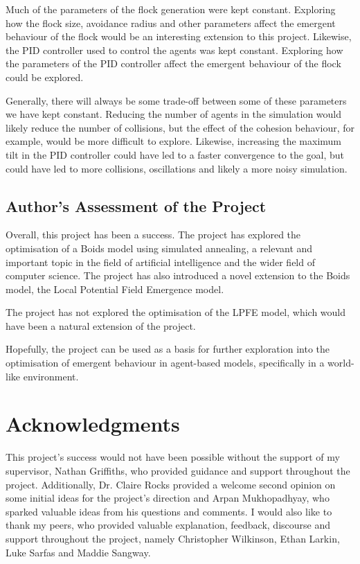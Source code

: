 \documentclass[12pt]{article}
\begin{document}
Much of the parameters of the flock generation were kept constant. Exploring how the flock size, avoidance radius and other parameters affect the emergent behaviour of the flock would be an interesting extension to this project. Likewise, the PID controller used to control the agents was kept constant. Exploring how the parameters of the PID controller affect the emergent behaviour of the flock could be explored.

Generally, there will always be some trade-off between some of these parameters we have kept constant. Reducing the number of agents in the simulation would likely reduce the number of collisions, but the effect of the cohesion behaviour, for example, would be more difficult to explore. Likewise, increasing the maximum tilt in the PID controller could have led to a faster convergence to the goal, but could have led to more collisions, oscillations and likely a more noisy simulation.

\subsection{Author's Assessment of the Project}


Overall, this project has been a success. The project has explored the optimisation of a Boids model using simulated annealing, a relevant and important topic in the field of artificial intelligence and the wider field of computer science. The project has also introduced a novel extension to the Boids model, the Local Potential Field Emergence model.

The project has not explored the optimisation of the LPFE model, which would have been a natural extension of the project.

Hopefully, the project can be used as a basis for further exploration into the optimisation of emergent behaviour in agent-based models, specifically in a world-like environment.

\newpage
\section*{Acknowledgments}
This project's success would not have been possible without the support of my supervisor, Nathan Griffiths, who provided guidance and support throughout the project. Additionally, Dr. Claire Rocks provided a welcome second opinion on some initial ideas for the project's direction and Arpan Mukhopadhyay, who sparked valuable ideas from his questions and comments. I would also like to thank my peers, who provided valuable explanation, feedback, discourse and support throughout the project, namely Christopher Wilkinson, Ethan Larkin, Luke Sarfas and Maddie Sangway.

\newpage

 
\end{document}
